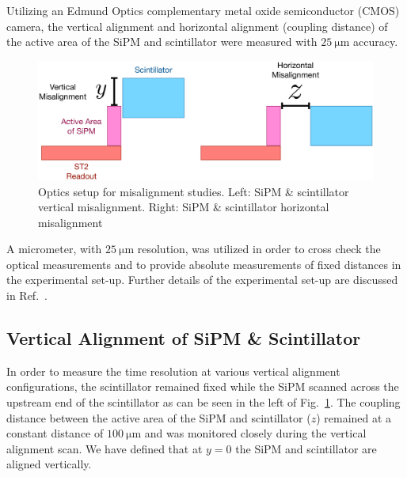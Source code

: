 Utilizing an Edmund Optics complementary metal oxide semiconductor (CMOS) camera, the vertical alignment and horizontal alignment (coupling distance) of the active area of the SiPM and scintillator were measured with $25~\mathrm{\mu m}$ accuracy.
	\begin{figure}[!htb]
		\centering
		\includegraphics[width=1.0\columnwidth]{misalignment/figs/st_misalignment}
		\caption{Optics setup for misalignment studies.  Left: SiPM \&
		scintillator vertical misalignment. Right: SiPM \&
		scintillator horizontal misalignment}
		\label{fig:sipm_va_optics}
	\end{figure}
A micrometer, with $25~\mathrm{\mu m}$ resolution, was utilized in order to cross check the optical measurements and to provide absolute measurements of fixed distances in the experimental set-up. Further details of the experimental set-up are discussed in Ref.~\cite{pooser16}.

\subsection{Vertical Alignment of SiPM \& Scintillator}
\label{sec:misalign_vert}


In order to measure the time resolution at various vertical alignment configurations, the scintillator remained fixed while the SiPM scanned across the upstream end of the scintillator as can be seen in the left of Fig.~\ref{fig:sipm_va_optics}. The coupling distance between the active area of the SiPM and scintillator ($z$) remained at a constant distance of $\mathrm{100\ \mu m}$ and was monitored closely during the vertical alignment scan.  We have defined that at $y = 0$ the SiPM and scintillator are aligned vertically.  %


